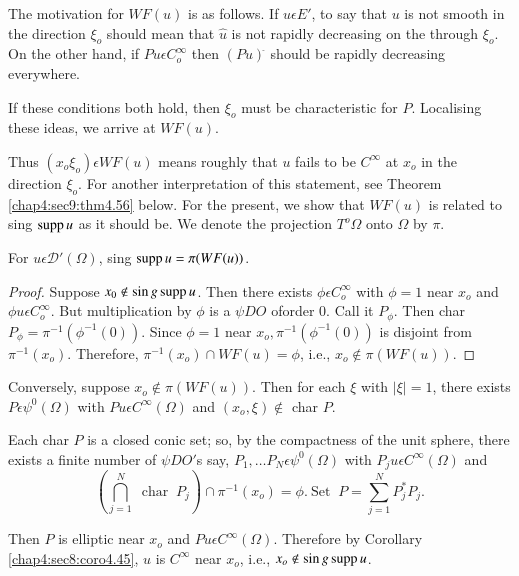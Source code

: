 The motivation for $WF(u)$ is as follows. If $u \epsilon E'$, to
say that $u$ is not smooth in the direction $\xi_o$ should mean that
$\hat{u}$ is not rapidly decreasing on the through $\xi_o$. On the
other hand, if  $Pu \epsilon C^{\infty}_o$ then $(Pu)^{\hat{}}$
should be rapidly decreasing everywhere. 


If these conditions both hold, then $\xi_o$ must be characteristic for
$P$. Localising these ideas, we arrive at $WF(u)$. 

Thus $(x_o \xi_o) \epsilon WF (u)$ means roughly that $u$ fails to
be $C^{\infty}$ at $x_o$ in the direction $\xi_o$. For another
interpretation of this statement, see Theorem \ref{chap4:sec9:thm4.56}
below. For the present, we show that $WF(u)$ is related to sing $\operatorname{supp} u$ as it
should be. We denote the projection $T^o \Omega$ onto $\Omega$ by
$\pi$. 

\setcounter{thm}{47}
\begin{thm}\label{chap4:sec9:thm4.48}%
  For $u \epsilon \mathcal{D}' (\Omega)$, sing $\operatorname{supp} u = \pi (WF(u))$.
\end{thm}

\begin{proof}
  Suppose $x_0 \notin \sin g \operatorname{supp} u$. Then there exists $\phi \epsilon
  C^{\infty}_o$ with $\phi =1$ near $x_o$ and $\phi u \epsilon
  C^{\infty}_o$. But multiplication by $\phi$ is a $\psi D O$
  of\pageoriginale order  $0$. Call it $P_{\phi}$. Then char $P_{\phi} =
  \pi^{-1}(\phi^{-1}(0))$. Since $\phi = 1$ near $x_o ,
  \pi^{-1}(\phi^{-1}(0))$ is disjoint from $\pi^{-1}(x_o)$. Therefore,
  $\pi^{-1}(x_o) \cap WF(u)= \phi$, i.e.,  $x_o \notin \pi (WF(u))$. 
\end{proof}

Conversely, suppose $x_o \notin \pi (WF(u))$. Then for each $\xi$ with
$|\xi|=1$, there exists $P \epsilon \psi^0 (\Omega)$ with $Pu
\epsilon C^{\infty}(\Omega)$ and $(x_o, \xi) \notin$ char $P$. 

Each char $P$ is a closed conic set; so, by the compactness of the
unit sphere, there exists a finite number of $\psi D O'$s say, $P_1,
\ldots P_N  \epsilon \psi^0 (\Omega)$ with $P_j u \epsilon
C^{\infty}(\Omega)$ and  
$$
\left(\bigcap^N_{j=1}  ~\text{ char }~ P_j\right) \cap \pi^{-1} (x_o)
= \phi. ~\text{Set }~ P = \sum^N_{j=1} P^*_j P_j. 
$$
 
Then $P$ is elliptic near $x_o$ and $P u \epsilon
C^{\infty}(\Omega)$. Therefore by Corollary \ref{chap4:sec8:coro4.45}, $u$ is $C^{\infty}$
near $x_o$, i.e., $x_o \notin  \sin g \operatorname{supp} u$. 

